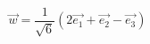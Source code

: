 \begin{displaymath}
 \overrightarrow{w}=\frac{1}{\sqrt{6}}(2\overrightarrow{e_1}+\overrightarrow{e_2}-\overrightarrow{e_3})
\end{displaymath}
